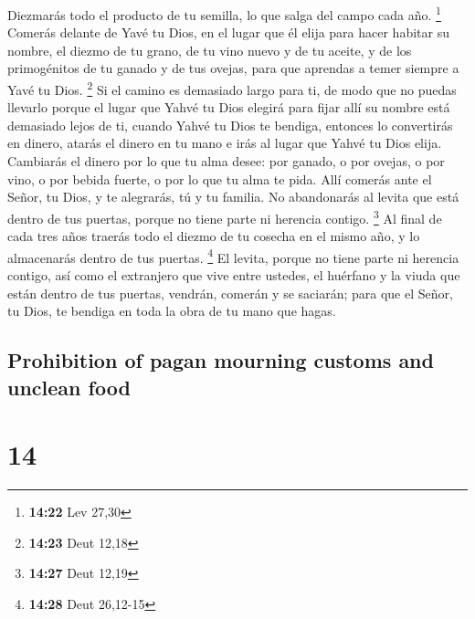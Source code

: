 \begin{paracol}{2}
 Diezmarás todo el producto de tu semilla, lo que salga
del campo cada año. \footnote{\textbf{14:22} Lev 27,30} 
Comerás delante de Yavé tu Dios, en el lugar que él elija para hacer
habitar su nombre, el diezmo de tu grano, de tu vino nuevo y de tu
aceite, y de los primogénitos de tu ganado y de tus ovejas, para que
aprendas a temer siempre a Yavé tu Dios. \footnote{\textbf{14:23} Deut
  12,18}  Si el camino es demasiado largo para ti, de
modo que no puedas llevarlo porque el lugar que Yahvé tu Dios elegirá
para fijar allí su nombre está demasiado lejos de ti, cuando Yahvé tu
Dios te bendiga,  entonces lo convertirás en dinero,
atarás el dinero en tu mano e irás al lugar que Yahvé tu Dios elija.
 Cambiarás el dinero por lo que tu alma desee: por
ganado, o por ovejas, o por vino, o por bebida fuerte, o por lo que tu
alma te pida. Allí comerás ante el Señor, tu Dios, y te alegrarás, tú y
tu familia.  No abandonarás al levita que está dentro de
tus puertas, porque no tiene parte ni herencia contigo. \footnote{\textbf{14:27}
  Deut 12,19}  Al final de cada tres años traerás todo el
diezmo de tu cosecha en el mismo año, y lo almacenarás dentro de tus
puertas. \footnote{\textbf{14:28} Deut 26,12-15}  El
levita, porque no tiene parte ni herencia contigo, así como el
extranjero que vive entre ustedes, el huérfano y la viuda que están
dentro de tus puertas, vendrán, comerán y se saciarán; para que el
Señor, tu Dios, te bendiga en toda la obra de tu mano que hagas.

\switchcolumn
\begin{otherlanguage}{english}

\hypertarget{prohibition-of-pagan-mourning-customs-and-unclean-food}{%
\subsection{Prohibition of pagan mourning customs and unclean
food}\label{prohibition-of-pagan-mourning-customs-and-unclean-food}}

\hypertarget{section-27}{%
\section{14}\label{section-27}}


\end{otherlanguage}
\end{paracol}

